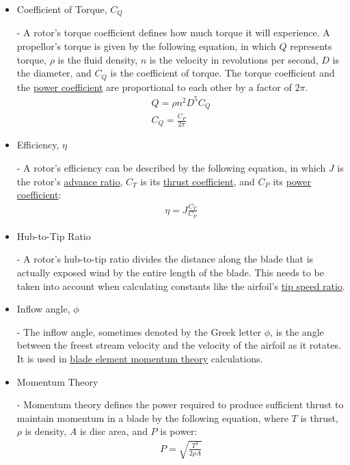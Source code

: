 \documentclass{article}
\begin{document}
\begin{itemize}
	\item \hypertarget{CQ}{Coefficient of Torque, $C_{Q}$} - A rotor's torque coefficient defines how much torque it will experience. A propellor's torque is given by the following equation, in which $Q$ represents torque, $\rho$ is the fluid density, $n$ is the velocity in revolutions per second, $D$ is the diameter, and $C_{Q}$ is the coefficient of torque. The torque coefficient and the \hyperlink{CP}{power coefficient} are proportional to each other by a factor of $2\pi$.
	\begin{equation}
	\begin{aligned}
		Q = \rho n^{2} D^{5} C_{Q} \\
		C_{Q} = \frac{C_{P}}{2 \pi}
	\end{aligned}
	\end{equation}
	
	\item \hypertarget{eta}{Efficiency, $\eta$} - A rotor's efficiency can be described by the following equation, in which $J$ is the rotor's \hyperlink{J}{advance ratio}, $C_{T}$ is its \hyperlink{CT}{thrust coefficient}, and $C_{P}$ its \hyperlink{CP}{power coefficient}:
	\begin{equation}
	\begin{aligned}
		\eta = J \frac{C_{T}}{C_{P}}
	\end{aligned}
	\end{equation}
	
	\item \hypertarget{D/D}{Hub-to-Tip Ratio} - A rotor's hub-to-tip ratio divides the distance along the blade that is actually exposed wind by the entire length of the blade. This needs to be taken into account when calculating constants like the airfoil's \hyperlink{lambda}{tip speed ratio}.
	
	\item \hypertarget{phi}{Inflow angle, $\phi$} - The inflow angle, sometimes denoted by the Greek letter $\phi$, is the angle between the freest stream velocity and the velocity of the airfoil as it rotates. It is used in \hyperlink{BEM}{blade element momentum theory} calculations.
	
	\item \hypertarget{MT}{Momentum Theory} - Momentum theory defines the power required to produce sufficient thrust to maintain momentum in a blade by the following equation, where $T$ is thrust, $\rho$ is density, $A$ is disc area, and $P$ is power:
	\begin{equation}
	\begin{aligned}
        		P = \sqrt{\frac{T^{3}}{2 \rho A}}
	\end{aligned}
	\end{equation}
	

\end{itemize}
\end{document}

